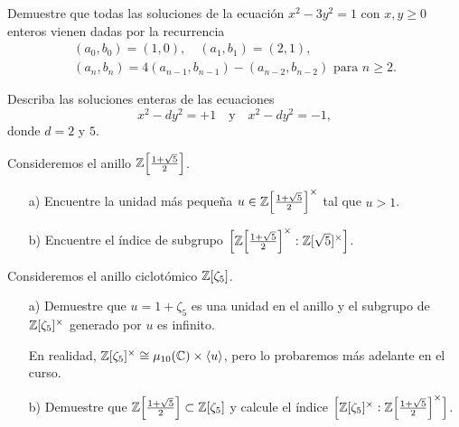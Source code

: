 \begin{ejercicio}
  Demuestre que todas las soluciones de la ecuación $x^2 - 3y^2 = 1$ con
  $x,y\ge 0$ enteros vienen dadas por la recurrencia
  \begin{gather*}
    (a_0,b_0) = (1,0), \quad (a_1,b_1) = (2,1),\\
    (a_n,b_n) = 4 (a_{n-1}, b_{n-1}) - (a_{n-2}, b_{n-2}) \text{ para }n\ge 2.
  \end{gather*}
\end{ejercicio}

\begin{ejercicio}
  Describa las soluciones enteras de las ecuaciones
  $$x^2 - dy^2 = +1 \quad\text{y}\quad x^2 - dy^2 = -1,$$
  donde $d = 2$ y $5$.
\end{ejercicio}

\begin{ejercicio}
  Consideremos el anillo $\mathbb{Z} \Bigl[\frac{1+\sqrt{5}}{2}\Bigr]$.

  \begin{enumerate}
  \item[a)] Encuentre la unidad más pequeña
    $u \in \mathbb{Z} \Bigl[\frac{1+\sqrt{5}}{2}\Bigr]^\times$ tal que $u > 1$.

  \item[b)] Encuentre el índice de subgrupo
    $\Bigl[\mathbb{Z} \Bigl[\frac{1+\sqrt{5}}{2}\Bigr]^\times :
           \mathbb{Z} [\sqrt{5}]^\times\Bigr]$.
  \end{enumerate}
\end{ejercicio}

\begin{ejercicio}
  Consideremos el anillo ciclotómico $\mathbb{Z} [\zeta_5]$.

  \begin{enumerate}
  \item[a)] Demuestre que $u = 1 + \zeta_5$ es una unidad en el anillo 
    y el subgrupo de $\mathbb{Z} [\zeta_5]^\times$ generado por $u$ es infinito.

    En realidad,
    $\mathbb{Z} [\zeta_5]^\times \cong \mu_{10} (\mathbb{C}) \times \langle u\rangle$,
    pero lo probaremos más adelante en el curso.

  \item[b)] Demuestre que
    $\mathbb{Z} \Bigl[\frac{1 + \sqrt{5}}{2}\Bigr] \subset \mathbb{Z} [\zeta_5]$ y calcule
    el índice
    $\Bigl[\mathbb{Z} [\zeta_5]^\times :
           \mathbb{Z} \Bigl[\frac{1 + \sqrt{5}}{2}\Bigr]^\times \Bigr]$.
  \end{enumerate}
\end{ejercicio}
